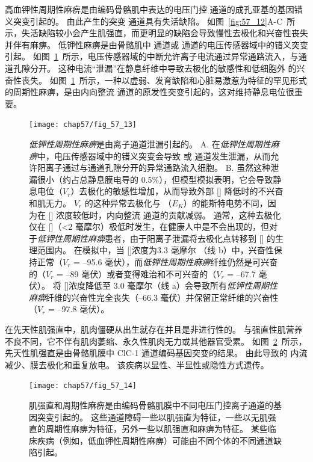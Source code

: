 高血钾性周期性麻痹是由编码骨骼肌中表达的电压门控  通道的成孔亚基的基因错义突变引起的。
由此产生的突变  通道具有失活缺陷。
如图~\ref{fig:57_12}A-C~所示，失活缺陷较小会产生肌强直，而更明显的缺陷会导致慢性去极化和兴奋性丧失并伴有麻痹。
低钾性麻痹是由骨骼肌中  通道或  通道的电压传感器域中的错义突变引起。
如图~\ref{fig:57_13}~所示，电压传感器域的中断允许离子电流通过异常通路流入，与通道孔隙分开。
这种电流“泄漏”在静息纤维中导致去极化的敏感性和低细胞外  的兴奋性丧失。
如图~\ref{fig:57_13}~所示，一种以虚弱、发育缺陷和心脏易激惹为特征的罕见形式的周期性麻痹，是由内向整流  通道的原发性突变引起的，这对维持静息电位很重要。


\begin{figure}[htbp]
	\centering
	\texttt{[image: chap57/fig\_57\_13]}
	\caption{\textit{低钾性周期性麻痹}是由离子通道泄漏引起的。
		A. 在\textit{低钾性周期性麻痹}中，电压传感器域中的错义突变会导致  或  通道发生泄漏，从而允许阳离子通过与通道孔隙分开的异常通路流入细胞。
		B. 虽然这种泄漏很小（约占总静息膜电导的 0.5\%），但模型模拟表明，它会导致静息电位（$V_r$）去极化的敏感性增加，从而导致外部 [] 降低时的不兴奋和肌无力。
		$V_r$ 的这种异常去极化与 （$E_K$）的能斯特电势不同，因为在 [] 浓度较低时，内向整流  通道的贡献减弱。
		通常，这种去极化仅在 []（<2 毫摩尔）极低时发生，在健康人中是不会出现的，但对于\textit{低钾性周期性麻痹}患者，由于阳离子泄漏将去极化点转移到 [] 的生理范围内。
		在模拟中，当 []浓度为3.3 毫摩尔 （线 b）中，兴奋性保持正常（$V_r$ = –95.6 毫伏），而\textit{低钾性周期性麻痹}纤维仍然是可兴奋的（$V_r$ = –89 毫伏）或者变得难治和不可兴奋的（$V_r$ = –67.7 毫伏）。
		将 []浓度降低至 3.0 毫摩尔（线 a）会导致所有\textit{低钾性周期性麻痹}纤维的兴奋性完全丧失（–66.3 毫伏）并保留正常纤维的兴奋性（$V_r$ = –97.8 毫伏）\cite{cannon2018sodium}。}
	\label{fig:57_13}
\end{figure}


在先天性肌强直中，肌肉僵硬从出生就存在并且是非进行性的。
与强直性肌营养不良不同，它不伴有肌肉萎缩、永久性肌肉无力或其他器官受累。
如图~\ref{fig:57_14}~所示，先天性肌强直是由骨骼肌膜中 ClC-1  通道编码基因突变的结果。
由此导致的  内流减少、膜去极化和重复放电。
该疾病以显性、半显性或隐性方式遗传。


\begin{figure}[htbp]
	\centering
	\texttt{[image: chap57/fig\_57\_14]}
	\caption{肌强直和周期性麻痹是由编码骨骼肌膜中不同电压门控离子通道的基因突变引起的。
		这些通道障碍一些以肌强直为特征，一些以无肌强直的周期性麻痹为特征，另外一些以肌强直和麻痹为特征。
		某些临床疾病（例如，低血钾性周期性麻痹）可能由不同个体的不同通道缺陷引起。}
	\label{fig:57_14}
\end{figure}




